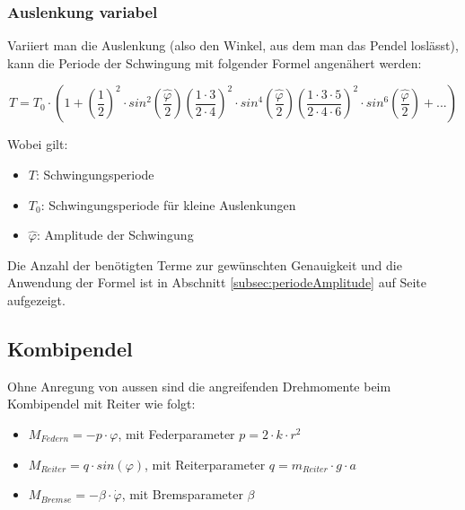 \subsubsection{Auslenkung variabel}
\label{subsec:schwerependel:amplivar}

Variiert  man  die  Auslenkung  (also  den Winkel,  aus  dem  man  das  Pendel
losl\"asst), kann die Periode der Schwingung mit folgender Formel angen\"ahert
werden:

\begin{equation}
    T = T_0 \cdot
        \left(
            1 +
            \left( \frac{1}{2} \right)^2 \cdot sin^2 \left( \frac{\hat{\varphi}}{2} \right)
            \left( \frac{1 \cdot 3}{2 \cdot 4} \right)^2 \cdot sin^4 \left( \frac{\hat{\varphi}}{2} \right)
            \left( \frac{1 \cdot 3 \cdot 5}{2 \cdot 4 \cdot 6} \right)^2 \cdot sin^6 \left( \frac{\hat{\varphi}}{2} \right)
            + ...
        \right)
\end{equation}

Wobei gilt:
\begin{itemize}
    \item
        $T$: Schwingungsperiode
    \item
        $T_0$: Schwingungsperiode f\"ur kleine Auslenkungen
    \item
        $\hat{\varphi}$: Amplitude der Schwingung
\end{itemize}

Die  Anzahl  der ben\"otigten  Terme  zur  gew\"unschten Genauigkeit  und  die
Anwendung der Formel ist  in Abschnitt \ref{subsec:periodeAmplitude} auf Seite
\pageref{subsec:periodeAmplitude} aufgezeigt.


\subsection{Kombipendel}
\label{subsec:theorie:kombipendel}

Ohne Anregung von aussen sind die angreifenden Drehmomente beim Kombipendel mit
Reiter wie folgt:

\begin{itemize}
    \item
        $M_{Federn} = -p \cdot \varphi$, mit Federparameter $p = 2 \cdot k \cdot r^2$
    \item
        $M_{Reiter} = q \cdot sin(\varphi)$, mit Reiterparameter $q = m_{Reiter} \cdot g \cdot a$
    \item
        $M_{Bremse} = - \beta \cdot \dot{\varphi}$, mit Bremsparameter $\beta$
\end{itemize}

